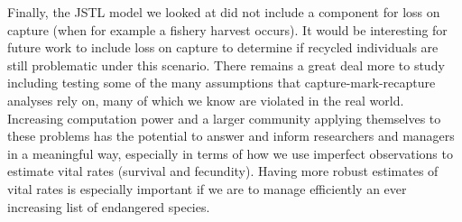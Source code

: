 \documentclass[12pt]{article}
\begin{document}
Finally, the JSTL model we looked at did not include a component for loss on capture (when for example a fishery harvest occurs).  It would be interesting for future work to include loss on capture to determine if recycled individuals are still problematic under this scenario.  There remains a great deal more to study including testing some of the many assumptions that capture-mark-recapture analyses rely on, many of which we know are violated in the real world. Increasing computation power and a larger community applying themselves to these problems has the potential to answer and inform researchers and managers in a meaningful way, especially in terms of how we use imperfect observations to estimate vital rates (survival and fecundity). Having more robust estimates of vital rates is especially important if we are to manage efficiently an ever increasing list of endangered species.







\bigskip




\end{document}
